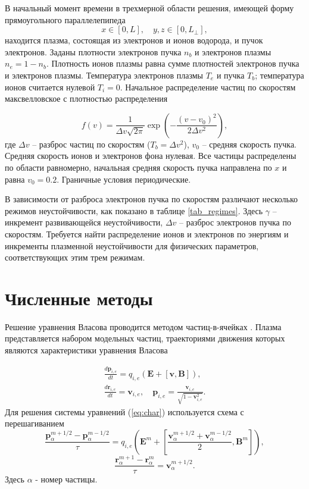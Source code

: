 В начальный момент времени в трехмерной области
решения, имеющей форму прямоугольного параллелепипеда $$
x\in[0,L],\quad y,z\in[0,L_\bot], $$ находится плазма, состоящая из
электронов и ионов водорода, и пучок электронов. Заданы плотности электронов пучка $n_b$ и электронов плазмы $n_e = 1-n_b$. Плотность ионов плазмы равна сумме плотностей электронов пучка и электронов плазмы. Температура электронов плазмы $T_e$ и пучка $T_b$; температура ионов считается нулевой $T_i=0$. Начальное распределение частиц по скоростям макс\-вел\-ловс\-кое с плотностью распределения

$$
f(v)=\frac{1}{\Delta v \sqrt{2
		\pi}}\exp \left( {-\frac{(v-v_0)^2}{2 \Delta v^2}}\right) ,
$$
где $\Delta v$ -- разброс частиц по скоростям ($T_b=\Delta v^2$), $v_0$ -- средняя
скорость пучка. Средняя скорость ионов и электронов фона нулевая. Все частицы распределены по области равномерно, начальная средняя скорость пучка направлена по $x$ и равна $v_0=0.2$. Граничные условия периодические. 





В зависимости от разброса электронов пучка по скоростям различают несколько режимов неустойчивости, как показано в таблице \ref{tab_regimes}. Здесь $\gamma$ --  инкремент развивающейся неустойчивости, $\Delta v $ -- разброс электронов пучка по скоростям. Требуется найти распределение ионов и электронов по энергиям и инкременты плазменной неустойчивости для физических параметров, соответствующих этим трем режимам.



\section{Численные методы}


Решение уравнения Власова проводится методом
частиц-в-ячейках \cite{VshivkovPICbook}. Плазма представляется набором модельных частиц, траекториями движения которых являются характеристики урав\-не\-ния Власова

\begin{eqnarray}\label{eq:char}
\frac{d \textbf{p} _{i,e}}{d t}=q_{i,e}(\textbf{E}+[\textbf{v},\textbf{B}]),
\\
\frac{d \textbf{r} _{i,e}}{d t}=\textbf{v}_{i,e}, \quad \textbf{p}_{i,e}=\frac{\textbf{v}_{i,e}}{\sqrt{1-\textbf{v}_{i,e}^2}}.\nonumber
\end{eqnarray}
Для решения системы уравнений (\ref{eq:char}) используется схема с перешагиванием 
$$
\frac{\textbf{p}^{m+1/2}_\alpha-\textbf{p}^{m-1/2}_\alpha}{\tau}=q_{i,e}\left({\textbf{E}}^m+\left[\frac{{\textbf{v}}^{m+1/2}_\alpha+{\textbf{v}}^{m-1/2}_\alpha}{2},{\textbf{B}}^m \right] \right),
$$
$$
\frac{{\textbf{r}}_\alpha^{m+1}-{\textbf{r}}_\alpha^{m}}{\tau}={\textbf{v}}^{m+1/2}_\alpha.
$$
Здесь $\alpha$ - номер частицы.

